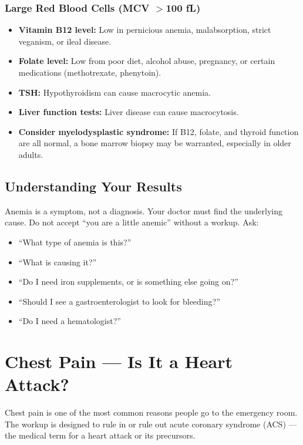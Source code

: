 \subsubsection{Large Red Blood Cells (MCV $>$100 fL)}

\begin{itemize}
    \item \textbf{Vitamin B12 level:} Low in pernicious anemia, malabsorption, strict veganism, or ileal disease.
    \item \textbf{Folate level:} Low from poor diet, alcohol abuse, pregnancy, or certain medications (methotrexate, phenytoin).
    \item \textbf{TSH:} Hypothyroidism can cause macrocytic anemia.
    \item \textbf{Liver function tests:} Liver disease can cause macrocytosis.
    \item \textbf{Consider myelodysplastic syndrome:} If B12, folate, and thyroid function are all normal, a bone marrow biopsy may be warranted, especially in older adults.
\end{itemize}

\subsection{Understanding Your Results}

Anemia is a symptom, not a diagnosis. Your doctor must find the underlying cause. Do not accept ``you are a little anemic'' without a workup. Ask:
\begin{itemize}
    \item ``What type of anemia is this?''
    \item ``What is causing it?''
    \item ``Do I need iron supplements, or is something else going on?''
    \item ``Should I see a gastroenterologist to look for bleeding?''
    \item ``Do I need a hematologist?''
\end{itemize}

\clearpage
\section{Chest Pain --- Is It a Heart Attack?}

Chest pain is one of the most common reasons people go to the emergency room. The workup is designed to rule in or rule out acute coronary syndrome (ACS) --- the medical term for a heart attack or its precursors.

